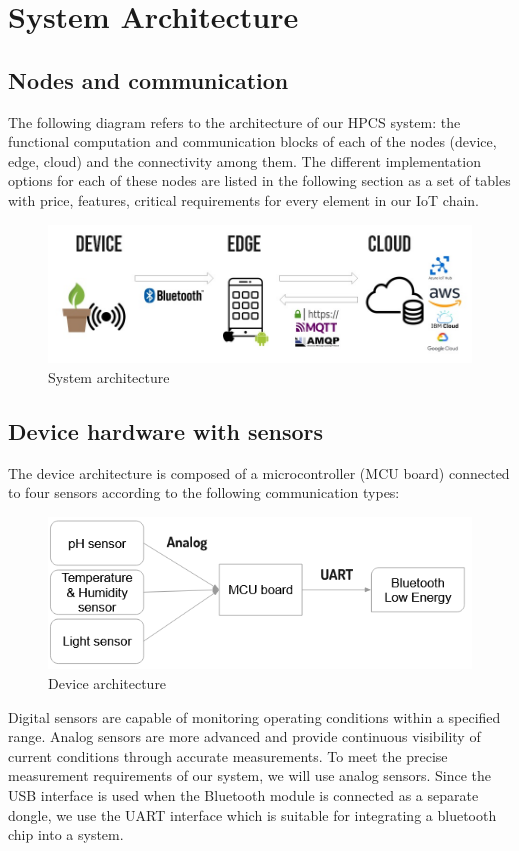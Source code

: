 \section{System Architecture}

\subsection{Nodes and communication}
The following diagram refers to the architecture of our HPCS system: the functional computation and communication blocks of each of the nodes (device, edge, cloud)  and the connectivity among them.
The different implementation options for each of these nodes are listed in the following section as a set of tables with price, features, critical requirements for every element in our IoT chain.

\begin{figure}[h]
    \includegraphics[width=\linewidth]{images/system-architecture.jpg}
    \caption{System architecture}
    \label{fig:System architecture}
\end{figure}

\subsection{Device hardware with sensors}
The device architecture is composed of a microcontroller (MCU board) connected to four sensors according to the following communication types: 

\begin{figure}[h]
    \centering
    \includegraphics[width=\linewidth]{images/device-architecture.jpg}
    \caption{Device architecture}
    \label{fig:Device architecture}
\end{figure}

Digital sensors are capable of monitoring operating conditions within a specified range. Analog sensors are more advanced and provide continuous visibility of current conditions through accurate measurements. To meet the precise measurement requirements of our system, we will use analog sensors.
Since the USB interface is used when the Bluetooth module is connected as a separate dongle, we use the UART interface which is suitable for integrating a bluetooth chip into a system.